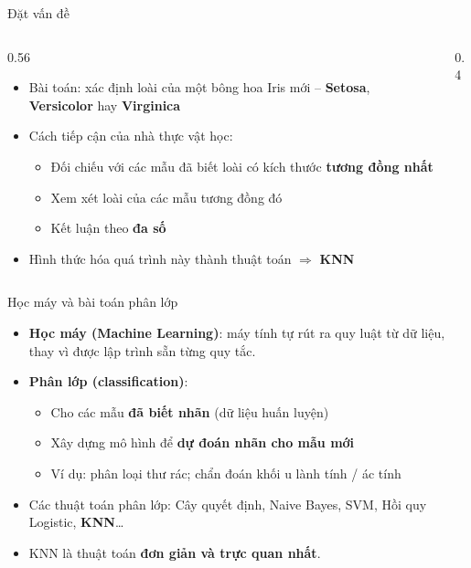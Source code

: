 \documentclass[aspectratio=169,10pt]{beamer}
\newcommand{\hl}[1]{\textcolor{nhan}{\textbf{#1}}}
\newcommand{\hx}[1]{\textcolor{xanh}{\textbf{#1}}}
\begin{document}
\begin{frame}{Đặt vấn đề}
\begin{columns}[c,totalwidth=\textwidth]
\begin{column}{0.56\textwidth}
\begin{itemize}\setlength\itemsep{0.6em}
  \item Bài toán: xác định loài của một bông hoa Iris mới -- \hl{Setosa}, \hl{Versicolor} hay \hl{Virginica}
  \item Cách tiếp cận của nhà thực vật học:
  \begin{itemize}
    \item Đối chiếu với các mẫu đã biết loài có kích thước \textbf{tương đồng nhất}
    \item Xem xét loài của các mẫu tương đồng đó
    \item Kết luận theo \textbf{đa số}
  \end{itemize}
  \item Hình thức hóa quá trình này thành thuật toán $\Rightarrow$ \hx{KNN}
\end{itemize}
\end{column}
\begin{column}{0.4\textwidth}
\centering
{}
\end{column}
\end{columns}
\end{frame}

\begin{frame}{Học máy và bài toán phân lớp}
\begin{itemize}\setlength\itemsep{0.7em}
  \item \textbf{Học máy (Machine Learning)}: máy tính tự rút ra quy luật từ dữ liệu, thay vì được lập trình sẵn từng quy tắc.
  \item \textbf{Phân lớp (classification)}:
  \begin{itemize}
    \item Cho các mẫu \textbf{đã biết nhãn} (dữ liệu huấn luyện)
    \item Xây dựng mô hình để \textbf{dự đoán nhãn cho mẫu mới}
    \item Ví dụ: phân loại thư rác; chẩn đoán khối u lành tính / ác tính
  \end{itemize}
  \item Các thuật toán phân lớp: Cây quyết định, Naive Bayes, SVM, Hồi quy Logistic, \hx{KNN}\ldots
  \item KNN là thuật toán \textbf{đơn giản và trực quan nhất}.
\end{itemize}
\end{frame}
\end{document}

